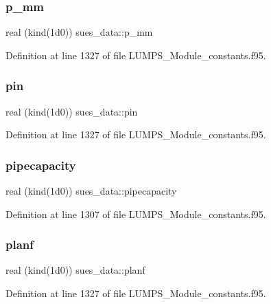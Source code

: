 \subsubsection{\texorpdfstring{p\+\_\+mm}{p\_mm}}
{\footnotesize\ttfamily real (kind(1d0)) sues\+\_\+data\+::p\+\_\+mm}



Definition at line 1327 of file L\+U\+M\+P\+S\+\_\+\+Module\+\_\+constants.\+f95.

\mbox{\label{namespacesues__data_aa2d35158f50e5437170a36712c99a891}} 
\subsubsection{\texorpdfstring{pin}{pin}}
{\footnotesize\ttfamily real (kind(1d0)) sues\+\_\+data\+::pin}



Definition at line 1327 of file L\+U\+M\+P\+S\+\_\+\+Module\+\_\+constants.\+f95.

\mbox{\label{namespacesues__data_ab2dc1363710dd5d250384fe643279fd7}} 
\subsubsection{\texorpdfstring{pipecapacity}{pipecapacity}}
{\footnotesize\ttfamily real (kind(1d0)) sues\+\_\+data\+::pipecapacity}



Definition at line 1307 of file L\+U\+M\+P\+S\+\_\+\+Module\+\_\+constants.\+f95.

\mbox{\label{namespacesues__data_a0489c46c970c2dd6ecdf0af0e11dee21}} 
\subsubsection{\texorpdfstring{planf}{planf}}
{\footnotesize\ttfamily real (kind(1d0)) sues\+\_\+data\+::planf}



Definition at line 1327 of file L\+U\+M\+P\+S\+\_\+\+Module\+\_\+constants.\+f95.

